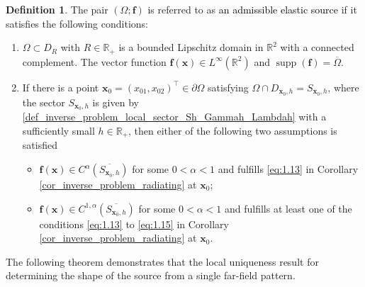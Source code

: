 \documentclass[11pt,reqno,oneside]{amsart}
\theoremstyle{definition}
\newtheorem{definition}{Definition}[section]
\theoremstyle{remark}
\numberwithin{equation}{section}
\numberwithin{equation}{section}
\theoremstyle{remark}
\DeclareMathOperator{\supp}{supp}
\begin{document}
\begin{definition} \label{def_admissible_elastic_source_local}
	The pair $ \left(\Omega; \mathbf{f}\right) $ is referred to as \textcolor{black}{an admissible elastic source} if it satisfies the following conditions:
	\begin{enumerate} [(1)]
		\item $ \Omega\subset D_R $ with $R\in \mathbb{R}_+$ is a bounded Lipschitz domain in $\mathbb{R}^2 $ with a connected complement. The vector function $ \mathbf{f}\left(\mathbf{x}\right)\in L^{\infty}\left(\mathbb{R}^2\right) $ and $ \supp\left(\mathbf{f}\right)=\overline{\Omega} $. 
		\item If there is a point $ \mathbf{x}_0=\left(x_{01},x_{02}\right)^{\top}\in\partial\Omega $ satisfying $ \Omega\cap D_{\mathbf{x}_0,h}=S_{\mathbf{x}_0,h} $, where the sector $ S_{\mathbf{x}_0,h} $ is given by \eqref{def_inverse_problem_local_sector_Sh_Gammah_Lambdah} with a sufficiently small $ h\in\mathbb{R}_+ $, then either of the following two assumptions is satisfied
		\begin{itemize}
			\item[(2.1)] $ \mathbf{f}\left(\mathbf{x}\right)\in C^{\alpha}\left(\overline{S_{\mathbf{x}_0,h}}\right) $ for some $ 0<\alpha<1 $ and fulfills  \eqref{eq:1.13}   in Corollary \ref{cor_inverse_problem_radiating} at $ \mathbf{x}_0 $;
			\item[(2.2)] $ \mathbf{f}\left(\mathbf{x}\right)\in C^{1, \alpha}\left(\overline{S_{\mathbf{x}_0,h}}\right) $ for some $ 0<\alpha<1 $ and fulfills at least one of the conditions \eqref{eq:1.13}  to \eqref{eq:1.15}  in Corollary \ref{cor_inverse_problem_radiating} at $ \mathbf{x}_0 $.
		\end{itemize}
	\end{enumerate}
\end{definition}

The following theorem demonstrates that the local uniqueness result for determining the shape of the source from a single far-field pattern.
\end{document}
